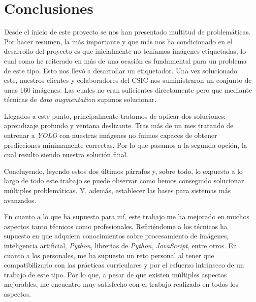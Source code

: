 

\section{Conclusiones}

Desde el inicio de este proyecto se nos han presentado multitud de problemáticas. Por hacer resumen, la más importante y que más nos ha condicionado en el desarrollo del proyecto es que inicialmente no teníamos imágenes etiquetadas, lo cual como he reiterado en más de una ocasión es fundamental para un problema de este tipo. Esto nos llevó a desarrollar un etiquetador. Una vez solucionado este, nuestros clientes y colaboradores del CSIC nos suministraron un conjunto de unas 160 imágenes. Las cuales no eran suficientes directamente pero que mediante técnicas de \textit{data augmentation} supimos solucionar.

Llegados a este punto, principalmente tratamos de aplicar dos soluciones: aprendizaje profundo y ventana deslizante. Tras más de un mes tratando de entrenar a \textit{YOLO} con nuestras imágenes no fuimos capaces de obtener predicciones mínimamente correctas. Por lo que pasamos a la segunda opción, la cual resulto siendo nuestra solución final.

Concluyendo, leyendo estos dos últimos párrafos y, sobre todo, lo expuesto a lo largo de todo este trabajo se puede observar como hemos conseguido solucionar múltiples problemáticas. Y, además, establecer las bases para sistemas más avanzados.

En cuanto a lo que ha supuesto para mí, este trabajo me ha mejorado en muchos aspectos tanto técnicos como profesionales. Refiriéndome a los técnicos ha supuesto en que adquiera conocimientos sobre procesamiento de imágenes, inteligencia artificial, \textit{Python}, librerias de \textit{Python}, \textit{JavaScript}, entre otros. En cuanto a los personales, me ha supuesto un reto personal al tener que compatibilizarlo con las prácticas curriculares y por el esfuerzo intrínseco de un trabajo de este tipo. Por lo que, a pesar de que existen múltiples aspectos mejorables, me encuentro muy satisfecho con el trabajo realizado en todos los aspectos.

